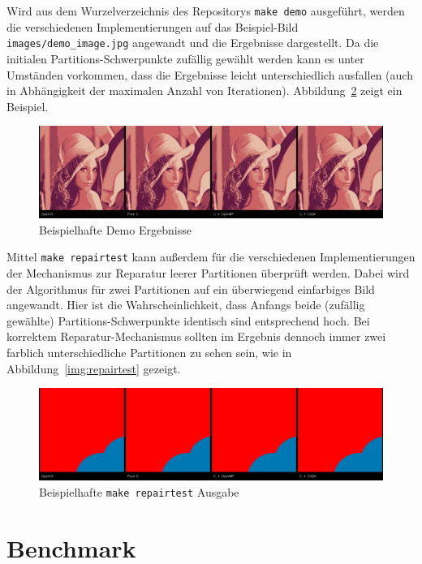 \documentclass[
    bibliography=totoc, cd=lightcolor, cdmath=false, ngerman]{tudscrreprt}
\begin{document}
Wird aus dem Wurzelverzeichnis des Repositorys \texttt{make demo} ausgeführt,
werden die verschiedenen Implementierungen auf das Beispiel-Bild
\texttt{images/demo\_image.jpg} angewandt und die Ergebnisse dargestellt. Da
die initialen Partitions-Schwerpunkte zufällig gewählt werden kann es unter
Umständen vorkommen, dass die Ergebnisse leicht unterschiedlich ausfallen
(auch in Abhängigkeit der maximalen Anzahl von Iterationen).
Abbildung~\ref{img:demoresults} zeigt ein Beispiel.

\begin{figure}[htbp]
  \centering
    \includegraphics[width=\textwidth]{report/resources/demo_results.jpg}
  \caption{Beispielhafte Demo Ergebnisse}
  \label{img:demoresults}
\end{figure}

Mittel \texttt{make repairtest} kann außerdem für die verschiedenen
Implementierungen der Mechanismus zur Reparatur leerer Partitionen überprüft
werden. Dabei wird der Algorithmus für zwei Partitionen auf ein überwiegend
einfarbiges Bild angewandt. Hier ist die Wahrscheinlichkeit, dass Anfangs beide
(zufällig gewählte) Partitions-Schwerpunkte identisch sind entsprechend hoch.
Bei korrektem Reparatur-Mechanismus sollten im Ergebnis dennoch immer zwei
farblich unterschiedliche Partitionen zu sehen sein, wie in
Abbildung~\ref{img:repairtest} gezeigt.

\begin{figure}[htbp]
  \centering
    \includegraphics[width=\textwidth]{report/resources/repairtest_results.jpg}
  \caption{Beispielhafte \texttt{make repairtest} Ausgabe}
  \label{img:demoresults}
\end{figure}

\section{Benchmark}
\end{document}
